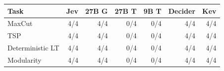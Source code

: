 \begin{tabular}{lrrrrrr}
\toprule
Task & Jev & 27B G & 27B T & 9B T & Decider & Kev \\
\midrule
MaxCut & 4/4 & 4/4 & 0/4 & 0/4 & 4/4 & 4/4 \\
TSP & 4/4 & 4/4 & 0/4 & 0/4 & 4/4 & 4/4 \\
Deterministic LT & 4/4 & 4/4 & 0/4 & 0/4 & 4/4 & 4/4 \\
Modularity & 4/4 & 4/4 & 0/4 & 0/4 & 4/4 & 4/4 \\
\bottomrule
\end{tabular}
